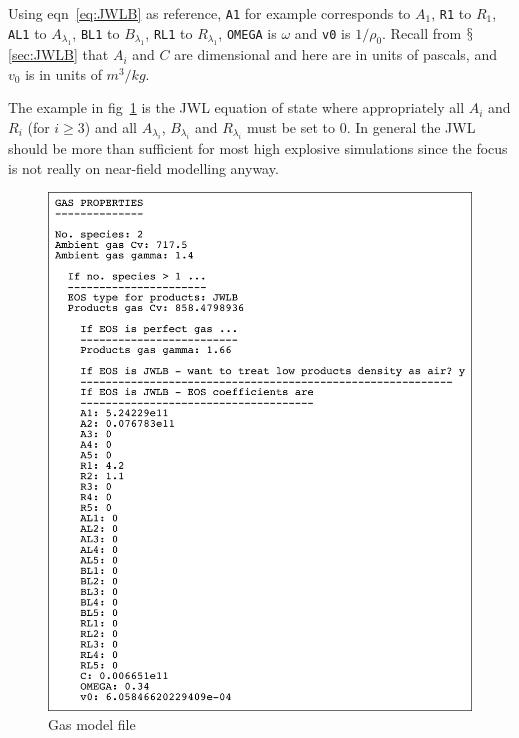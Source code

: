 \documentclass[pdftex, 12pt, a4paper]{report}
\begin{document}
\begin{enumerate}
    Using eqn~\ref{eq:JWLB} as reference, \verb'A1' for example corresponds to $A_1$, \verb'R1' to $R_1$, \verb'AL1' to $A_{\lambda_1}$,
    \verb'BL1' to $B_{\lambda_1}$, \verb'RL1' to $R_{\lambda_1}$, \verb'OMEGA' is $\omega$ and \verb'v0' is $1/\rho_0$.
    Recall from $\mathsection$\ref{sec:JWLB} that $A_i$ and $C$ are dimensional and here are in units of pascals, and $v_0$ is
    in units of $m^3/kg$.
    
    The example in fig~\ref{fig:ov_gas.par} is the JWL equation of state where appropriately all $A_i$ and $R_i$ (for $i \ge 3$) 
    and all $A_{\lambda_i}$, $B_{\lambda_i}$ and $R_{\lambda_i}$ must be set to 0.  In general the JWL should be more than
    sufficient for most high explosive simulations since the focus is not really on near-field modelling anyway.
    
\end{enumerate}

\begin{figure}[htp]
\centering
\includegraphics[width=15cm]{pics/ov_gas_template.jpg}
\caption{Gas model file}
\label{fig:ov_gas.par}
\end{figure}
\pagebreak
\end{document}
